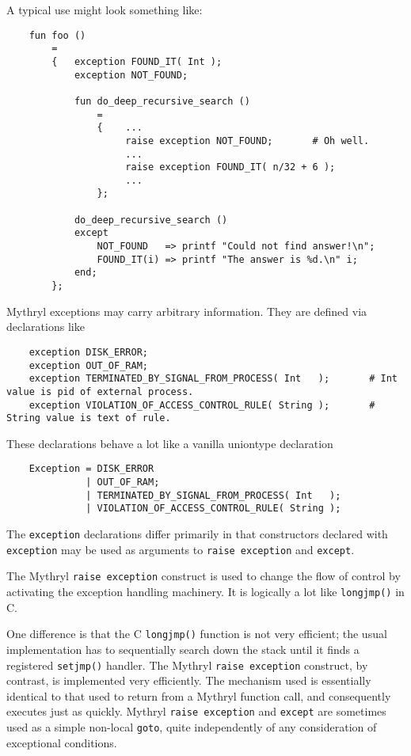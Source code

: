 A typical use might look something like:

\begin{verbatim}
    fun foo ()
        =
        {   exception FOUND_IT( Int );
            exception NOT_FOUND;

            fun do_deep_recursive_search ()
                =
                {    ...
                     raise exception NOT_FOUND;       # Oh well.
                     ...
                     raise exception FOUND_IT( n/32 + 6 );
                     ...
                };

            do_deep_recursive_search ()
            except
                NOT_FOUND   => printf "Could not find answer!\n";
                FOUND_IT(i) => printf "The answer is %d.\n" i;
            end;
        };
\end{verbatim}


Mythryl exceptions may carry arbitrary information.  They are 
defined via declarations like

\begin{verbatim}
    exception DISK_ERROR;
    exception OUT_OF_RAM;
    exception TERMINATED_BY_SIGNAL_FROM_PROCESS( Int   );       # Int value is pid of external process.
    exception VIOLATION_OF_ACCESS_CONTROL_RULE( String );       # String value is text of rule. 
\end{verbatim}

These declarations behave a lot like a vanilla 
uniontype declaration

\begin{verbatim}
    Exception = DISK_ERROR
              | OUT_OF_RAM;
              | TERMINATED_BY_SIGNAL_FROM_PROCESS( Int   );
              | VIOLATION_OF_ACCESS_CONTROL_RULE( String );
\end{verbatim}

The {\tt exception} declarations differ primarily in that 
constructors declared with {\tt exception} may be used as arguments to {\tt raise exception} and {\tt except}.

The Mythryl {\tt raise exception} construct is used to change the flow of control 
by activating the exception handling machinery. 
It is logically a lot like {\tt longjmp()} in C.

One difference is that the C {\tt longjmp()} function is not very 
efficient; the usual implementation has to sequentially search down 
the stack until it finds a registered {\tt setjmp()} handler. 
The Mythryl {\tt raise exception} construct, by contrast, is implemented very 
efficiently.  The mechanism used is essentially identical to that 
used to return from a Mythryl function call, and consequently 
executes just as quickly.  Mythryl {\tt raise exception} and {\tt except} 
are sometimes used as a simple non-local {\tt goto}, quite independently 
of any consideration of exceptional conditions.

